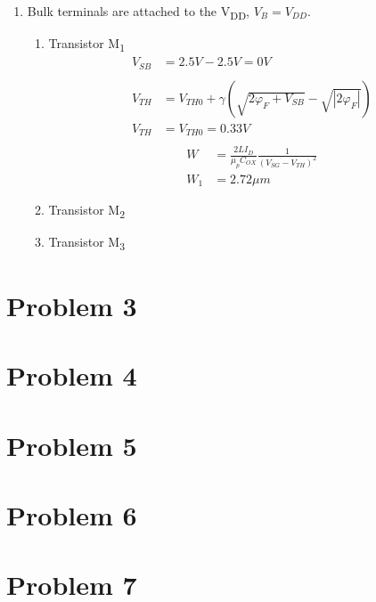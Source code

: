 \documentclass{article}
\begin{document}
\begin{enumerate}
\item Bulk terminals are attached to the V\textsubscript{DD}, \(V_{B} = V_{DD}\).
\begin{enumerate}
\item Transistor M\textsubscript{1}
\begin{equation*}
\begin{align}
V_{SB} &= 2.5 V - 2.5 V = 0 V \\
\\
V_{TH} &= V_{TH0} + \gamma{}(\sqrt{2\varphi_{F} + V_{SB}} - \sqrt{|2\varphi_{F}|}) \\
V_{TH} &= V_{TH0} = 0.33 V \\
\end{align}
\end{equation*}
\begin{equation*}
\begin{align}
W &= \frac{2LI_{D}}{\mu_{p}C_{OX}}\frac{1}{(V_{SG} - V_{TH})^{2}} \\
W_{1} &= 2.72 \mu{}m
\end{align}
\end{equation*}
\item Transistor M\textsubscript{2}
\item Transistor M\textsubscript{3}
\end{enumerate}
\end{enumerate}

\section{Problem 3}
\label{sec:org88ba6eb}
\section{Problem 4}
\label{sec:orgbc2a7f1}
\section{Problem 5}
\label{sec:orgd297614}
\section{Problem 6}
\label{sec:orgdda4120}
\section{Problem 7}
\label{sec:org18d6755}
\end{document}
